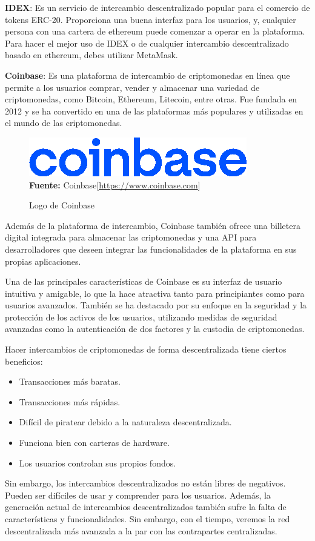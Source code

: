 \hfill \break
\textbf{IDEX}: Es un servicio de intercambio descentralizado popular para el
comercio de tokens ERC-20. Proporciona una buena interfaz para los usuarios,
y, cualquier persona con una cartera de ethereum puede comenzar a operar en
la plataforma. Para hacer el mejor uso de IDEX o de cualquier intercambio
descentralizado basado en ethereum, debes utilizar MetaMask.

\hfill \break
\textbf{Coinbase}: Es una plataforma de intercambio de criptomonedas en línea
que permite a los usuarios comprar, vender y almacenar una variedad de
criptomonedas, como Bitcoin, Ethereum, Litecoin, entre otras. Fue fundada en
2012 y se ha convertido en una de las plataformas más populares y utilizadas
en el mundo de las criptomonedas.
\begin{figure}[htb!]
    \caption{Logo de Coinbase}
    \label{fig:coinbase-logo}
    \centering
    \includegraphics[scale=1]{./Ilustraciones/coinbase-logo.png}\\
    \textbf{Fuente:} Coinbase[\url{https://www.coinbase.com}]
\end{figure}
Además de la plataforma de intercambio, Coinbase también ofrece una billetera
digital integrada para almacenar las criptomonedas y una API para
desarrolladores que deseen integrar las funcionalidades de la plataforma en sus
propias aplicaciones.

\hfill \break
Una de las principales características de Coinbase es su interfaz de usuario
intuitiva y amigable, lo que la hace atractiva tanto para principiantes como
para usuarios avanzados. También se ha destacado por su enfoque en la seguridad
y la protección de los activos de los usuarios, utilizando medidas de seguridad
avanzadas como la autenticación de dos factores y la custodia de criptomonedas.

\hfill \break
Hacer intercambios de criptomonedas de forma descentralizada tiene ciertos
beneficios:
\begin{itemize}
    \item Transacciones más baratas.
    \item Transacciones más rápidas.
    \item Difícil de piratear debido a la naturaleza descentralizada.
    \item Funciona bien con carteras de hardware.
    \item Los usuarios controlan sus propios fondos.
\end{itemize}
Sin embargo, los intercambios descentralizados no están libres de negativos.
Pueden ser difíciles de usar y comprender para los usuarios. Además, la
generación actual de intercambios descentralizados también sufre la falta de
características y funcionalidades. Sin embargo, con el tiempo, veremos la red
descentralizada más avanzada a la par con las contrapartes centralizadas.

